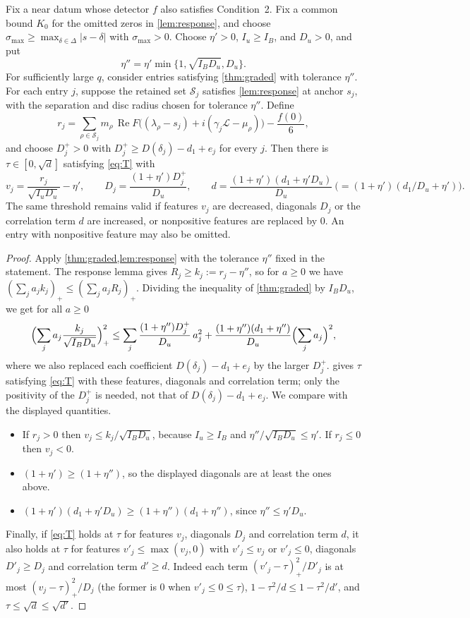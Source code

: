 \documentclass[11pt]{amsart}
\numberwithin{equation}{section}
\theoremstyle{plain}
\theoremstyle{definition}
\theoremstyle{remark}
\newcommand{\LL}{\mathcal{L}}
\renewcommand{\Re}{\operatorname{Re}}
\newcommand{\cS}{\mathcal{S}}
\newcommand{\1}{\mathbf{1}}
\begin{document}
\begin{corollary}\label{cor:zeroform}
Fix a near datum whose detector $f$ also satisfies Condition~2. Fix a common bound
$K_0$ for the omitted zeros in \cref{lem:response}, and choose
$\sigma_{\max}\ge\max_{\delta\in\Delta}|s-\delta|$ with $\sigma_{\max}>0$.
Choose $\eta'>0$, $I_u\ge I_B$, and $D_u>0$, and put
\[
  \eta''=\eta'\min\{1,\sqrt{I_BD_u},D_u\}.
\]
For sufficiently large $q$, consider entries satisfying \cref{thm:graded} with tolerance
$\eta''$. For each entry $j$, suppose the retained set $\cS_j$ satisfies
\cref{lem:response} at anchor $s_j$, with the separation and disc radius chosen for
tolerance $\eta''$. Define
\[
  r_j=\sum_{\rho\in\cS_j}m_\rho\,\Re F\bigl((\lambda_\rho-s_j)+i(\gamma_j\LL-\mu_\rho)\bigr)-\frac{f(0)}6 ,
\]
and choose $D_j^+>0$ with $D_j^+\ge D(\delta_j)-d_1+e_j$ for every $j$.
Then there is $\tau\in[0,\sqrt d]$ satisfying \eqref{eq:T} with
\[
  v_j=\frac{r_j}{\sqrt{I_uD_u}}-\eta',\qquad D_j=\frac{(1+\eta')D_j^+}{D_u},\qquad
  d=\frac{(1+\eta')(d_1+\eta'D_u)}{D_u}\ \bigl(=(1+\eta')(d_1/D_u+\eta')\bigr).
\]
The same threshold remains valid if features $v_j$ are decreased, diagonals $D_j$ or
the correlation term $d$ are increased, or nonpositive features are replaced by $0$.
An entry with nonpositive feature may also be omitted.
\end{corollary}

\begin{proof}
Apply \cref{thm:graded,lem:response} with the tolerance $\eta''$ fixed in the statement.
The response lemma gives $R_j\ge k_j:=r_j-\eta''$, so for $a\ge0$
we have $(\sum_ja_jk_j)_+\le(\sum_ja_jR_j)_+$. Dividing the inequality of \cref{thm:graded} by
$I_BD_u$, we get for all $a\ge0$
\[
  \Bigl(\sum_ja_j\frac{k_j}{\sqrt{I_BD_u}}\Bigr)_+^2\le
  \sum_j\frac{(1+\eta'')D_j^+}{D_u}\,a_j^2+\frac{(1+\eta'')(d_1+\eta'')}{D_u}
  \Bigl(\sum_ja_j\Bigr)^2 ,
\]
where we also replaced each coefficient $D(\delta_j)-d_1+e_j$ by the larger $D_j^+$.
 gives $\tau$ satisfying \eqref{eq:T} with these features, diagonals and
correlation term; only the positivity of the $D_j^+$ is needed, not that of $D(\delta_j)-d_1+e_j$. We compare with the displayed quantities.
\begin{itemize}
  \item If $r_j>0$ then $v_j\le k_j/\sqrt{I_BD_u}$, because $I_u\ge I_B$ and
    $\eta''/\sqrt{I_BD_u}\le\eta'$. If $r_j\le0$ then $v_j<0$.
  \item $(1+\eta')\ge(1+\eta'')$, so the displayed diagonals are at least the ones above.
  \item $(1+\eta')(d_1+\eta'D_u)\ge(1+\eta'')(d_1+\eta'')$, since $\eta''\le\eta'D_u$.
\end{itemize}
Finally, if \eqref{eq:T} holds at $\tau$ for features $v_j$, diagonals $D_j$ and correlation term $d$, it
also holds at $\tau$ for features $v'_j\le\max(v_j,0)$ with $v'_j\le v_j$ or $v'_j\le0$, diagonals
$D'_j\ge D_j$ and correlation term $d'\ge d$. Indeed each term $(v'_j-\tau)_+^2/D'_j$ is at most
$(v_j-\tau)_+^2/D_j$ (the former is $0$ when $v'_j\le0\le\tau$), $1-\tau^2/d\le1-\tau^2/d'$, and
$\tau\le\sqrt d\le\sqrt{d'}$.
\end{proof}
\end{document}
